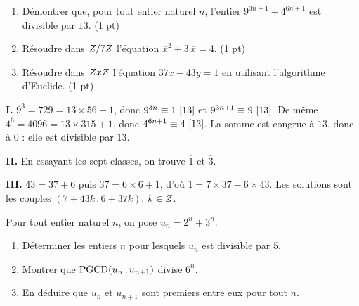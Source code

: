 \begin{commeaubac}
\begin{enumerate}[label=\textbf{\Roman*.}, leftmargin=*, itemsep=0.3em]
  \item Démontrer que, pour tout entier naturel $n$, l'entier
        $9^{3n+1}+4^{6n+1}$ est divisible par $13$. \hfill\textup{(1 pt)}
  \item Résoudre dans $Z/7Z$ l'équation
        $\overline x^{2}+\overline3\,\overline x = \overline4$.
        \hfill\textup{(1 pt)}
  \item Résoudre dans $ZxZ$ l'équation $37x-43y = 1$ en utilisant
        l'algorithme d'Euclide. \hfill\textup{(1 pt)}
\end{enumerate}
\end{commeaubac}

\begin{corrige}
\textbf{I.} $9^{3} = 729 = 13\times56+1$, donc $9^{3n} \equiv 1 \ [13]$ et
$9^{3n+1} \equiv 9 \ [13]$. De même $4^{6} = 4096 = 13\times315+1$, donc
$4^{6n+1} \equiv 4 \ [13]$. La somme est congrue à $13$, donc à $0$ : elle est
divisible par $13$.

\textbf{II.} En essayant les sept classes, on trouve $\overline1$ et
$\overline3$.

\textbf{III.} $43 = 37+6$ puis $37 = 6\times6+1$, d'où
$1 = 7\times37-6\times43$. Les solutions sont les couples
$(7+43k\,;6+37k)$, $k \in Z$.
\end{corrige}

\begin{concours}
Pour tout entier naturel $n$, on pose $u_{n} = 2^{n}+3^{n}$.

\begin{enumerate}[label=\textbf{\arabic*.}, leftmargin=*, itemsep=0.25em]
  \item Déterminer les entiers $n$ pour lesquels $u_{n}$ est divisible par
        $5$.
  \item Montrer que $\operatorname{PGCD}(u_{n}\,;u_{n+1})$ divise $6^{n}$.
  \item En déduire que $u_{n}$ et $u_{n+1}$ sont premiers entre eux pour tout
        $n$.
\end{enumerate}
\end{concours}

